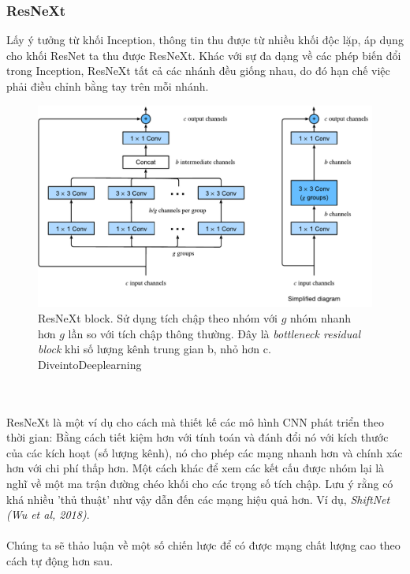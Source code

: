 \documentclass{article}
\begin{document}
\subsubsection{ResNeXt}
Lấy ý tưởng từ khối Inception, thông tin thu được từ nhiều khối độc lặp, áp dụng cho khối ResNet ta thu được ResNeXt. Khác với sự đa dạng về các phép biến đổi trong Inception, ResNeXt tất cả các nhánh đều giống nhau, do đó hạn chế việc phải điều chỉnh bằng tay trên mỗi nhánh.
\begin{figure}
    \centering
    \includegraphics[width = 0.7\linewidth]{resnext-block.pdf}
    \caption{ResNeXt block. Sử dụng tích chập theo nhóm với $g$ nhóm nhanh hơn $g$ lần so với tích chập thông thường. Đây là \textit{bottleneck residual block} khi số lượng kênh trung gian b, nhỏ hơn c. DiveintoDeeplearning}
    \label{fig18}
\end{figure}
\phantom{a}\\\\
ResNeXt là một ví dụ cho cách mà thiết kế các mô hình CNN phát triển theo thời gian: Bằng cách tiết kiệm hơn với tính toán và đánh đổi nó với kích thước của các kích hoạt (số lượng kênh), nó cho phép các mạng nhanh hơn và chính xác hơn với chi phí thấp hơn. Một cách khác để xem các kết cấu được nhóm lại là nghĩ về một ma trận đường chéo khối cho các trọng số tích chập. Lưu ý rằng có khá nhiều 'thủ thuật' như vậy dẫn đến các mạng hiệu quả hơn. Ví dụ, \textit{ShiftNet (Wu et al, 2018)}.\\\\
Chúng ta sẽ thảo luận về một số chiến lược để có được mạng chất lượng cao theo cách tự động hơn sau.
\end{document}

